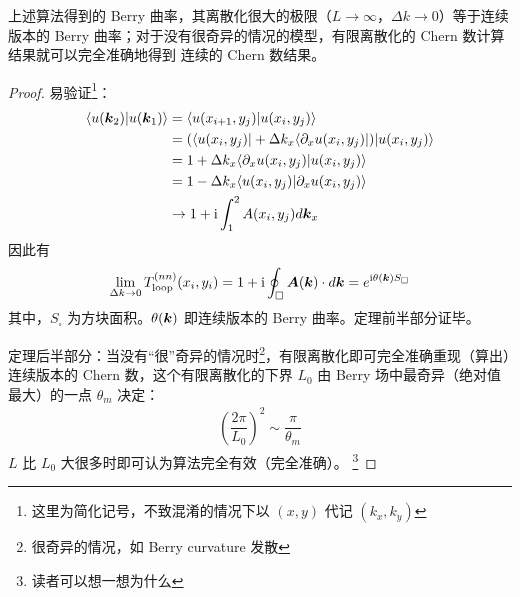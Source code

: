 \begin{theorem}
上述算法得到的 Berry 曲率，其离散化很大的极限（$L\rightarrow\infty$，$\Delta k\rightarrow0$）等于连续版本的 Berry 曲率；对于没有很奇异的情况的模型，有限离散化的 Chern 数计算结果就可以完全准确地得到 连续的 Chern 数结果。
\end{theorem}

\begin{proof}
易验证\footnote{这里为简化记号，不致混淆的情况下以 $(x,y)$ 代记 $(k_x,k_y)$}：
\begin{align}
\langle u(\boldsymbol{k}_2)|u(\boldsymbol{k}_1)\rangle 
&= \langle u(x_{i+1},y_j)|u(x_i,y_j)\rangle \\ 
&= (\langle u(x_i,y_j)| + \Delta k_x\langle\partial_xu(x_i,y_j)|)|u(x_i,y_j)\rangle \\ 
&= 1 + \Delta k_x \langle\partial_xu(x_i,y_j)|u(x_i,y_j)\rangle \\ 
&= 1 - \Delta k_x \langle u(x_i,y_j)|\partial_xu(x_i,y_j)\rangle \\
&\rightarrow 1 + \mathrm{i} \int_1^2A(x_i,y_j)d\boldsymbol{k}_x
\end{align}
因此有
\begin{align}
\lim_{\Delta k\rightarrow0} T_{\text{loop}}^{(nn)}(x_i,y_i) = 
1 + \mathrm{i} \oint_{\square} \boldsymbol{A}(\boldsymbol{k})\cdot d\boldsymbol{k} = e^{\mathrm{i}\theta(\boldsymbol{k}) S_{\square}} 
\end{align}
其中，$S_{\square}$ 为方块面积。$\theta(\boldsymbol{k})$ 即连续版本的 Berry 曲率。定理前半部分证毕。

定理后半部分：当没有“很”奇异的情况时\footnote{很奇异的情况，如 Berry curvature 发散}，有限离散化即可完全准确重现（算出）连续版本的 Chern 数，这个有限离散化的下界 $L_0$ 由 Berry 场中最奇异（绝对值最大）的一点 $\theta_m$ 决定：
\begin{align}
\left(\dfrac{2\pi}{L_0}\right)^2 \sim \dfrac{\pi}{\theta_{m}}
\end{align}
$L$ 比 $L_0$ 大很多时即可认为算法完全有效（完全准确）。
\footnote{读者可以想一想为什么}
\end{proof}







